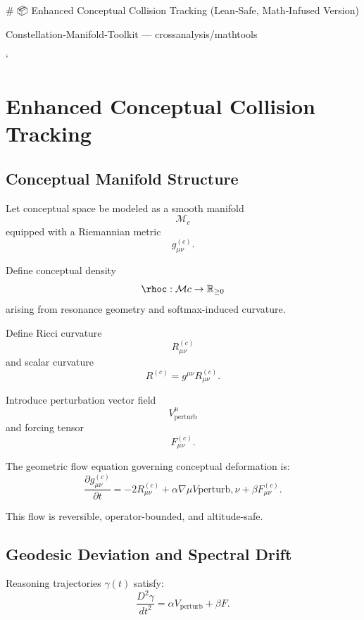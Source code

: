 # 📦 Enhanced Conceptual Collision Tracking (Lean‑Safe, Math‑Infused Version)

Constellation‑Manifold‑Toolkit — crossanalysis/mathtools

`

\section{Enhanced Conceptual Collision Tracking}
\label{sec:EnhancedConceptualCollisionTracking}

\subsection{Conceptual Manifold Structure}

Let conceptual space be modeled as a smooth manifold
\[
\mathcal{M}_c
\]
equipped with a Riemannian metric
\[
g^{(c)}_{\mu\nu}.
\]

Define conceptual density
\[
\rhoc : \mathcal{M}c \to \mathbb{R}_{\ge 0}
\]
arising from resonance geometry and softmax-induced curvature.

Define Ricci curvature
\[
R^{(c)}_{\mu\nu}
\]
and scalar curvature
\[
R^{(c)} = g^{\mu\nu} R^{(c)}_{\mu\nu}.
\]

Introduce perturbation vector field
\[
V_{\text{perturb}}^\mu
\]
and forcing tensor
\[
F^{(c)}_{\mu\nu}.
\]

The geometric flow equation governing conceptual deformation is:
\[
\frac{\partial g^{(c)}_{\mu\nu}}{\partial t}
= -2 R^{(c)}_{\mu\nu}
+ \alpha \nabla\mu V{\text{perturb},\nu}
+ \beta F^{(c)}_{\mu\nu}.
\]

This flow is reversible, operator-bounded, and altitude-safe.

\subsection{Geodesic Deviation and Spectral Drift}

Reasoning trajectories $\gamma(t)$ satisfy:
\[
\frac{D^2 \gamma}{dt^2}
= \alpha V_{\text{perturb}} + \beta F.
\]

